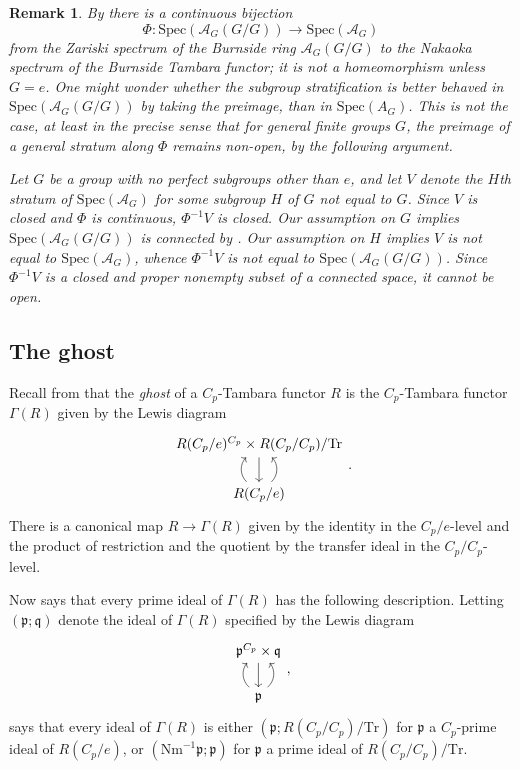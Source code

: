 \documentclass[11pt,dvipsnames]{amsart}
\newcommand{\A}{\mathcal{A}}
\newcommand{\p}{\mathfrak{p}}
\newcommand{\q}{\mathfrak{q}}
\theoremstyle{BoldRemark}
\newtheorem{remark}[theorem]{Remark}
\newcommand{\Spec}{\mathrm{Spec}}
\newcommand{\Nm}{\mathrm{Nm}}
\newcommand{\Tr}{\mathrm{Tr}}
\newcommand{\ghost}{\Gamma}
\begin{document}
\begin{remark}\label{rem:cf_4DSC_Theorem_4.19}
    By \cite[Proposition 4.19]{4DSC} there is a continuous bijection 
    \[ 
        \Phi : \Spec(\A_G(G/G)) \rightarrow \Spec(\A_G) 
    \] 
    from the Zariski spectrum of the Burnside ring $\A_G(G/G)$ to the Nakaoka spectrum of the Burnside Tambara functor; it is not a homeomorphism unless $G = e$. One might wonder whether the subgroup stratification is better behaved in $\Spec(\A_G(G/G))$ by taking the preimage, than in $\Spec(A_G)$. This is not the case, at least in the precise sense that for general finite groups $G$, the preimage of a general stratum along $\Phi$ remains non-open, by the following argument.

    Let $G$ be a group with no perfect subgroups other than $e$, and let $V$ denote the $H$th stratum of $\Spec(\A_G)$ for some subgroup $H$ of $G$ not equal to $G$. Since $V$ is closed and $\Phi$ is continuous, $\Phi^{-1} V$ is closed. Our assumption on $G$ implies $\Spec(\A_G(G/G))$ is connected by \cite[Theorem 2]{Sch79}. Our assumption on $H$ implies $V$ is not equal to $\Spec(\A_G)$, whence $\Phi^{-1} V$ is not equal to $\Spec(\A_G(G/G))$. Since $\Phi^{-1} V$ is a closed and proper nonempty subset of a connected space, it cannot be open.
\end{remark}

\subsection{The ghost}\label{subsec:ghost_example}

Recall from \cite[Definition 7.3]{4DS} that the \emph{ghost} of a $C_p$-Tambara functor $R$ is the $C_p$-Tambara functor $\ghost(R)$ given by the Lewis diagram
\[ \begin{tikzcd}
    R(C_p/e)^{C_p} \times R(C_p/C_p)/\Tr \arrow[d] \\
    R(C_p/e) \arrow[u, bend left = 45] \arrow[u, bend right = 45, swap]
\end{tikzcd} . \]
There is a canonical map $R \rightarrow \ghost(R)$ given by the identity in the $C_p/e$-level and the product of restriction and the quotient by the transfer ideal in the $C_p/C_p$-level. 

Now \cite[Theorem F]{4DS} says that every prime ideal of $\ghost(R)$ has the following description. Letting $(\p;\q)$ denote the ideal of $\ghost(R)$ specified by the Lewis diagram 
\[ \begin{tikzcd} 
    \p^{C_p} \times \q \arrow[d] \\
    \p \arrow[u, bend left = 45] \arrow[u, bend right = 45, swap]
\end{tikzcd} , \]
\cite[Theorem F]{4DS} says that every ideal of $\ghost(R)$ is either $(\p;R(C_p/C_p)/\Tr)$ for $\p$ a $C_p$-prime ideal of $R(C_p/e)$, or $(\Nm^{-1}\p;\p)$ for $\p$ a prime ideal of $R(C_p/C_p)/\Tr$.
\end{document}
